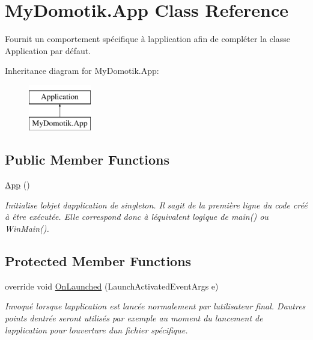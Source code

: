 \hypertarget{class_my_domotik_1_1_app}{}\section{My\+Domotik.\+App Class Reference}
\label{class_my_domotik_1_1_app}


Fournit un comportement spécifique à l\textquotesingle{}application afin de compléter la classe Application par défaut.  


Inheritance diagram for My\+Domotik.\+App\+:\begin{figure}[H]
\begin{center}
\leavevmode
\includegraphics[height=2.000000cm]{class_my_domotik_1_1_app}
\end{center}
\end{figure}
\subsection*{Public Member Functions}
\begin{DoxyCompactItemize}
\item 
\hyperlink{class_my_domotik_1_1_app_aabf4dc41cd74620d8a80b0108edc923b}{App} ()
\begin{DoxyCompactList}\small\item\em Initialise l\textquotesingle{}objet d\textquotesingle{}application de singleton. Il s\textquotesingle{}agit de la première ligne du code créé à être exécutée. Elle correspond donc à l\textquotesingle{}équivalent logique de main() ou Win\+Main(). \end{DoxyCompactList}\end{DoxyCompactItemize}
\subsection*{Protected Member Functions}
\begin{DoxyCompactItemize}
\item 
override void \hyperlink{class_my_domotik_1_1_app_a019ff3d5998b0378b68a017b91f1f53d}{On\+Launched} (Launch\+Activated\+Event\+Args e)
\begin{DoxyCompactList}\small\item\em Invoqué lorsque l\textquotesingle{}application est lancée normalement par l\textquotesingle{}utilisateur final. D\textquotesingle{}autres points d\textquotesingle{}entrée seront utilisés par exemple au moment du lancement de l\textquotesingle{}application pour l\textquotesingle{}ouverture d\textquotesingle{}un fichier spécifique. \end{DoxyCompactList}\end{DoxyCompactItemize}
